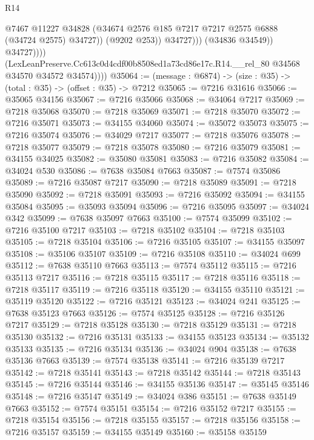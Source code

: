 \begin{lexlean}{R14}
\begin{coremodule}
                              @7467
                              @11227
                              @34828
                              (@34674 @2576 @185 @7217 @7217 @2575 @6888 (@34724 @2575) @34727))
                            (@9202 @253))
                          @34727)))
                    (@34836 @34549))
                  @34727))))
          (LexLeanPreserve.Cc613c0d4cdf00b8508ed1a73cd86e17c.R14.__rel_80
            @34568
            @34570
            @34572
            @34574))))
@35064 := (message : @6874) -> (size : @35) -> (total : @35) -> (offset : @35) -> @7212
@35065 := @7216 @31616
@35066 := @35065 @34156
@35067 := @7216 @35066
@35068 := @34064 @7217
@35069 := @7218 @35068
@35070 := @7218 @35069
@35071 := @7218 @35070
@35072 := @7216 @35071
@35073 := @34155 @34060
@35074 := @35072 @35073
@35075 := @7216 @35074
@35076 := @34029 @7217
@35077 := @7218 @35076
@35078 := @7218 @35077
@35079 := @7218 @35078
@35080 := @7216 @35079
@35081 := @34155 @34025
@35082 := @35080 @35081
@35083 := @7216 @35082
@35084 := @34024 @530
@35086 := @7638 @35084 @7663
@35087 := @7574 @35086
@35089 := @7216 @35087 @7217
@35090 := @7218 @35089
@35091 := @7218 @35090
@35092 := @7218 @35091
@35093 := @7216 @35092
@35094 := @34155 @35084
@35095 := @35093 @35094
@35096 := @7216 @35095
@35097 := @34024 @342
@35099 := @7638 @35097 @7663
@35100 := @7574 @35099
@35102 := @7216 @35100 @7217
@35103 := @7218 @35102
@35104 := @7218 @35103
@35105 := @7218 @35104
@35106 := @7216 @35105
@35107 := @34155 @35097
@35108 := @35106 @35107
@35109 := @7216 @35108
@35110 := @34024 @699
@35112 := @7638 @35110 @7663
@35113 := @7574 @35112
@35115 := @7216 @35113 @7217
@35116 := @7218 @35115
@35117 := @7218 @35116
@35118 := @7218 @35117
@35119 := @7216 @35118
@35120 := @34155 @35110
@35121 := @35119 @35120
@35122 := @7216 @35121
@35123 := @34024 @241
@35125 := @7638 @35123 @7663
@35126 := @7574 @35125
@35128 := @7216 @35126 @7217
@35129 := @7218 @35128
@35130 := @7218 @35129
@35131 := @7218 @35130
@35132 := @7216 @35131
@35133 := @34155 @35123
@35134 := @35132 @35133
@35135 := @7216 @35134
@35136 := @34024 @904
@35138 := @7638 @35136 @7663
@35139 := @7574 @35138
@35141 := @7216 @35139 @7217
@35142 := @7218 @35141
@35143 := @7218 @35142
@35144 := @7218 @35143
@35145 := @7216 @35144
@35146 := @34155 @35136
@35147 := @35145 @35146
@35148 := @7216 @35147
@35149 := @34024 @386
@35151 := @7638 @35149 @7663
@35152 := @7574 @35151
@35154 := @7216 @35152 @7217
@35155 := @7218 @35154
@35156 := @7218 @35155
@35157 := @7218 @35156
@35158 := @7216 @35157
@35159 := @34155 @35149
@35160 := @35158 @35159

\end{coremodule}
\end{lexlean}
